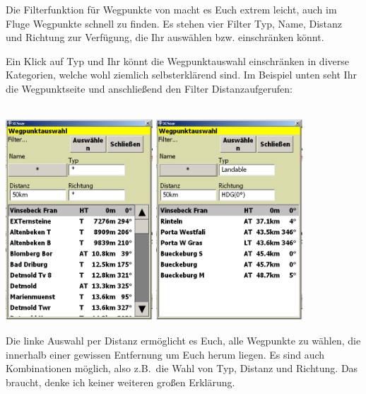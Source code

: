 Die Filterfunktion für Wegpunkte von \xc macht es Euch extrem leicht, auch im Fluge Wegpunkte schnell zu finden.
Es stehen vier Filter \textsf{Typ}, \textsf{Name}, \textsf{Distanz} und \textsf{Richtung} zur Verfügung, die Ihr auswählen bzw. einschränken könnt.

Ein Klick auf \textsf{Typ} und Ihr könnt die Wegpunktauswahl einschränken in diverse Kategorien, welche wohl ziemlich selbsterklärend sind. Im Beispiel unten seht Ihr die Wegpunktseite und anschließend den Filter \textsf{Distanz}aufgerufen:

\begin{center}
\blink~\\

\includegraphics[width=5.5cm]{Bilder/WegpunktauswahlDistanz.png}\qquad
\includegraphics[width=5.5cm]{Bilder/WegpunktauswahlTypRichtungDistanz.png}
\end{center}

Die linke Auswahl per \textsf{Distanz} ermöglicht es Euch, alle Wegpunkte zu wählen, die innerhalb einer gewissen Entfernung um Euch herum liegen. Es sind auch Kombinationen möglich, also z.B.\ die Wahl von \textsf{Typ}, \textsf{Distanz} und \textsf{Richtung}. Das braucht, denke ich keiner weiteren großen Erklärung.


